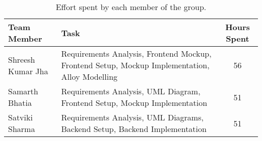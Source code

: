 
\begin{table}[H]
    \centering
    \begin{tabular}{@{} p{} p{} c @{}}
        \toprule
        \textbf{Team Member} & \textbf{Task} & \textbf{Hours Spent} \\ 
        \midrule
        Shreesh Kumar Jha & Requirements Analysis, Frontend Mockup, Frontend Setup, Mockup Implementation, Alloy Modelling & 56 \\ 
        Samarth Bhatia & Requirements Analysis, UML Diagram, Frontend Setup, Mockup Implementation & 51 \\ 
        Satviki Sharma & Requirements Analysis, UML Diagrams, Backend Setup, Backend Implementation & 51 \\ 
        \bottomrule
    \end{tabular}
    \caption{Effort spent by each member of the group.}
    \label{tab:effort_spent}
\end{table}
